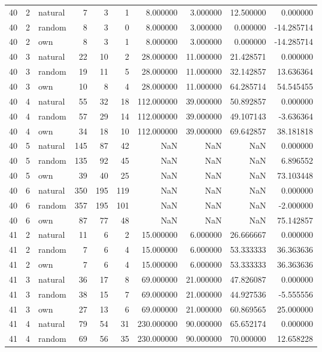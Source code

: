 \begin{table}[htbp]
\begin{tabular}{rrlrrrrrrr}
40 & 2 & natural & 7 & 3 & 1 & 8.000000 & 3.000000 & 12.500000 & 0.000000 \\
40 & 2 & random & 8 & 3 & 0 & 8.000000 & 3.000000 & 0.000000 & -14.285714 \\
40 & 2 & own & 8 & 3 & 1 & 8.000000 & 3.000000 & 0.000000 & -14.285714 \\
40 & 3 & natural & 22 & 10 & 2 & 28.000000 & 11.000000 & 21.428571 & 0.000000 \\
40 & 3 & random & 19 & 11 & 5 & 28.000000 & 11.000000 & 32.142857 & 13.636364 \\
40 & 3 & own & 10 & 8 & 4 & 28.000000 & 11.000000 & 64.285714 & 54.545455 \\
40 & 4 & natural & 55 & 32 & 18 & 112.000000 & 39.000000 & 50.892857 & 0.000000 \\
40 & 4 & random & 57 & 29 & 14 & 112.000000 & 39.000000 & 49.107143 & -3.636364 \\
40 & 4 & own & 34 & 18 & 10 & 112.000000 & 39.000000 & 69.642857 & 38.181818 \\
40 & 5 & natural & 145 & 87 & 42 & NaN & NaN & NaN & 0.000000 \\
40 & 5 & random & 135 & 92 & 45 & NaN & NaN & NaN & 6.896552 \\
40 & 5 & own & 39 & 40 & 25 & NaN & NaN & NaN & 73.103448 \\
40 & 6 & natural & 350 & 195 & 119 & NaN & NaN & NaN & 0.000000 \\
40 & 6 & random & 357 & 195 & 101 & NaN & NaN & NaN & -2.000000 \\
40 & 6 & own & 87 & 77 & 48 & NaN & NaN & NaN & 75.142857 \\
41 & 2 & natural & 11 & 6 & 2 & 15.000000 & 6.000000 & 26.666667 & 0.000000 \\
41 & 2 & random & 7 & 6 & 4 & 15.000000 & 6.000000 & 53.333333 & 36.363636 \\
41 & 2 & own & 7 & 6 & 4 & 15.000000 & 6.000000 & 53.333333 & 36.363636 \\
41 & 3 & natural & 36 & 17 & 8 & 69.000000 & 21.000000 & 47.826087 & 0.000000 \\
41 & 3 & random & 38 & 15 & 7 & 69.000000 & 21.000000 & 44.927536 & -5.555556 \\
41 & 3 & own & 27 & 13 & 6 & 69.000000 & 21.000000 & 60.869565 & 25.000000 \\
41 & 4 & natural & 79 & 54 & 31 & 230.000000 & 90.000000 & 65.652174 & 0.000000 \\
41 & 4 & random & 69 & 56 & 35 & 230.000000 & 90.000000 & 70.000000 & 12.658228 \\

\end{tabular}
\end{table}
